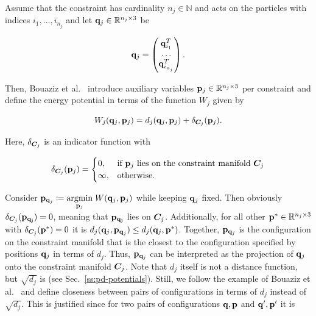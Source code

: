 Assume that the constraint has cardinality 
$n_j \in \mathbb{N}$ and acts on the particles with indices $i_1, \ldots, i_{n_j}$ and let $\mathbf{q}_j \in \mathbb{R}^{n_j \times 3}$ be

\[
    \mathbf{q}_j = \begin{pmatrix}
        \mathbf{q}_{i_1}^T \\
        \ldots \\
        \mathbf{q}_{i_{n_j}}^T
    \end{pmatrix}.
\]

\noindent Then, Bouaziz et al.\ \cite{bouaziz2014} introduce auxiliary variables $\mathbf{p}_j \in \mathbb{R}^{n_j \times 3}$ per constraint 
and define the energy potential in terms of the function $W_j$ given by 

\begin{equation}\label{eq:pd-Wj}
    W_j(\mathbf{q}_j, \mathbf{p}_j) = d_j(\mathbf{q}_j, \mathbf{p}_j) + \delta_{\bm{C}_j}(\mathbf{p}_j).
\end{equation}

\noindent Here, $\delta_{\bm{C}_j}$ is an indicator function with 

\[
\delta_{\bm{C}_j}(\mathbf{p}_j)= 
\begin{cases}
0,& \text{if } \mathbf{p}_j \text{ lies on the constraint manifold } \bm{C}_j \\
\infty,& \text{otherwise.}
\end{cases}
\]

\noindent Consider $\mathbf{p}_{\mathbf{q}_j} \coloneqq \underset{\mathbf{p}_j}{\operatorname{argmin}}\; W(\mathbf{q}_j, \mathbf{p}_j)$ while keeping $\mathbf{q}_j$ 
fixed. Then obviously 
$\delta_{\bm{C}_j}(\mathbf{p_{\mathbf{q}_j}}) = 0$, meaning that $\mathbf{p_{\mathbf{q}_j}}$ lies on $\bm{C}_j$. Additionally, 
for all other
$\mathbf{p}^* \in \mathbb{R}^{n_j \times 3}$ with $\delta_{\bm{C}_j}(\mathbf{p}^*) = 0$ it is $d_j(\mathbf{q}_j, \mathbf{p}_{\mathbf{q}_j}) 
\leq
d_j(\mathbf{q}_j, \mathbf{p}^*)$. Together, $\mathbf{p}_{\mathbf{q}_j}$ is the configuration on the constraint manifold that is the closest to 
the configuration specified by positions $\mathbf{q}_j$ in terms of $d_j$. Thus, $\mathbf{p}_{\mathbf{q}_j}$ can be 
interpreted as the projection of $\mathbf{q}_j$ onto the constraint manifold $\bm{C}_j$. Note that $d_j$ itself is not a distance 
function, but $\sqrt{d_j}$ is (see Sec.\ \ref{ss:pd-potentials}). Still, we follow the example of Bouaziz et al.\ \cite{bouaziz2014} 
and define closeness between pairs of configurations in terms of $d_j$ instead of $\sqrt{d_j}$. This is justified since for two pairs
of configurations $\mathbf{q}, \mathbf{p}$ and $\mathbf{q}^\prime, \mathbf{p}^\prime$ it is 

